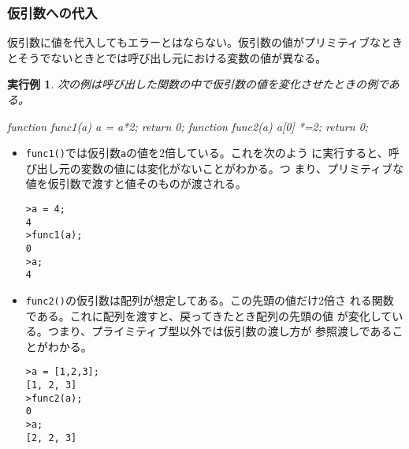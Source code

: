 \documentclass[a4j]{jarticle}
\newtheorem{Exec}{実行例}[section]
\begin{document}
\subsubsection{仮引数への代入}
仮引数に値を代入してもエラーとはならない。仮引数の値がプリミティブなとき
とそうでないときとでは呼び出し元における変数の値が異なる。
\begin{Exec}\label{Params}
 次の例は呼び出した関数の中で仮引数の値を変化させたときの例である。
\begin{listing}{1}
function func1(a){
  a = a*2;
  return 0;
}
function func2(a){
  a[0] *=2;
  return 0;
}
\end{listing}
\end{Exec}
\begin{itemize}
 \item \verb+func1()+では仮引数\verb+a+の値を2倍している。これを次のよう
       に実行すると、呼び出し元の変数の値には変化がないことがわかる。つ
       まり、プリミティブな値を仮引数で渡すと値そのものが渡される。
\begin{Verbatim}
>a = 4;
4
>func1(a);
0
>a;
4
\end{Verbatim}
 \item \verb+func2()+の仮引数は配列が想定してある。この先頭の値だけ2倍さ
       れる関数である。これに配列を渡すと、戻ってきたとき配列の先頭の値
       が変化している。つまり、プライミティブ型以外では仮引数の渡し方が
       参照渡しであることがわかる。
\begin{Verbatim}
>a = [1,2,3];
[1, 2, 3]
>func2(a);
0
>a;
[2, 2, 3]
\end{Verbatim}
\end{itemize}
\end{document}
